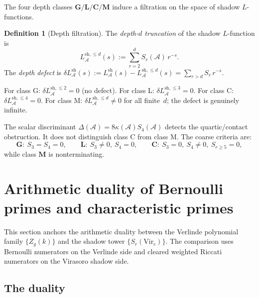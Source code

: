 \documentclass[11pt,reqno]{amsart}
\theoremstyle{definition}
\newtheorem{definition}[theorem]{Definition}
\theoremstyle{remark}
\providecommand{\cA}{\mathcal{A}}
\providecommand{\sh}{\mathrm{sh}}
\numberwithin{equation}{section}
\begin{document}
The four depth classes $\mathbf{G}/\mathbf{L}/\mathbf{C}/\mathbf{M}$
induce a filtration on the space of shadow $L$-functions.

\begin{definition}[Depth filtration]\label{def:depth-filtration}
  The \emph{depth-$d$ truncation} of the shadow $L$-function is
  \begin{equation}\label{eq:depth-truncation}
    L^{\sh,\le d}_\cA(s)
    := \sum_{r=2}^{d} S_r(\cA)\, r^{-s}.
  \end{equation}
  The \emph{depth defect} is
  $\delta L^{\sh}_\cA(s)
  := L^{\sh}_\cA(s) - L^{\sh,\le d}_\cA(s)
  = \sum_{r > d} S_r\, r^{-s}$.
\end{definition}

For class G: $\delta L^{\sh, \le 2}_\cA = 0$ (no defect).
For class L: $\delta L^{\sh, \le 3}_\cA = 0$.
For class C: $\delta L^{\sh, \le 4}_\cA = 0$.
For class M: $\delta L^{\sh, \le d}_\cA \ne 0$ for all
finite~$d$; the defect is genuinely infinite.

The scalar discriminant $\Delta(\cA)=8\kappa(\cA)S_4(\cA)$ detects
the quartic/contact obstruction. It does not distinguish class C
from class M. The coarse criteria are:
\[
\mathbf G:\ S_3=S_4=0,\qquad
\mathbf L:\ S_3\ne0,\ S_4=0,\qquad
\mathbf C:\ S_3=0,\ S_4\ne0,\ S_{r\ge5}=0,
\]
while class $\mathbf M$ is nonterminating.


\section{Arithmetic duality of Bernoulli primes and characteristic
 primes}\label{sec:arithmetic-duality}

This section anchors the arithmetic duality between the Verlinde
polynomial family $\{Z_g(k)\}$ and the shadow tower
$\{S_r(\mathrm{Vir}_c)\}$. The comparison uses Bernoulli
numerators on the Verlinde side and cleared weighted Riccati
numerators on the Virasoro shadow side.

\subsection{The duality}
\end{document}
